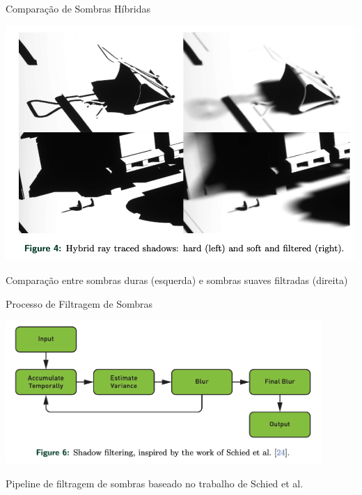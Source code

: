 \documentclass[aspectratio=169,xcolor=table]{beamer}
\begin{document}
\begin{frame}{Comparação de Sombras Híbridas}
    \begin{center}
        \includegraphics[height=0.8\textheight]{shadow-filter}
    \end{center}
    \begin{center}
        \small{Comparação entre sombras duras (esquerda) e sombras suaves filtradas (direita)}
    \end{center}
\end{frame}

\begin{frame}{Processo de Filtragem de Sombras}
    \begin{center}
        \includegraphics[width=0.9\textwidth]{shadow-filtering}
    \end{center}
    \begin{center}
        \small{Pipeline de filtragem de sombras baseado no trabalho de Schied et al. \cite{Schied2017}}
    \end{center}
\end{frame}
\end{document}
